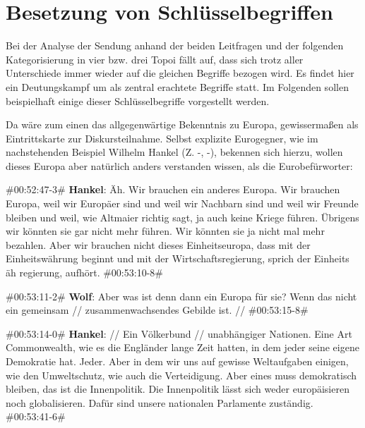 \section{Besetzung von Schlüsselbegriffen}\label{chap:schluesselbegriffe}

Bei der Analyse der Sendung anhand der beiden Leitfragen und der folgenden Kategorisierung in vier bzw. drei Topoi fällt auf, dass sich trotz aller Unterschiede immer wieder auf die gleichen Begriffe bezogen wird. Es findet hier ein Deutungskampf um als zentral erachtete Begriffe statt. Im Folgenden sollen beispielhaft einige dieser Schlüsselbegriffe vorgestellt werden.

Da wäre zum einen das allgegenwärtige Bekenntnis zu Europa, gewissermaßen als Eintrittskarte zur Diskursteilnahme. Selbst explizite Eurogegner, wie im nachstehenden Beispiel Wilhelm Hankel (Z. -, -), bekennen sich hierzu, wollen dieses Europa aber natürlich anders verstanden wissen, als die Eurobefürworter:

\begin{description}
	\begin{linenumbers}[1]
		\item \#00:52:47-3\# \textbf{Hankel}: Äh. Wir brauchen ein anderes Europa. Wir brauchen Europa, weil wir Europäer sind und weil wir Nachbarn sind und weil wir Freunde bleiben und weil, wie Altmaier richtig sagt, ja auch keine Kriege führen. Übrigens wir könnten sie gar nicht mehr führen. Wir könnten sie ja nicht mal mehr bezahlen. Aber wir brauchen nicht dieses Einheitseuropa, dass mit der Einheitswährung beginnt und mit der Wirtschaftsregierung, sprich der Einheits äh regierung, aufhört. \#00:53:10-8\#
		
		\item \#00:53:11-2\# \textbf{Wolf}: Aber was ist denn dann ein Europa für sie? Wenn das nicht ein gemeinsam // zusammenwachsendes Gebilde ist. // \#00:53:15-8\#
		
		\item \#00:53:14-0\# \textbf{Hankel}: // Ein Völkerbund // unabhängiger Nationen. Eine Art Commonwealth, wie es die Engländer lange Zeit hatten, in dem jeder seine eigene Demokratie hat. Jeder. Aber in dem wir uns auf gewisse Weltaufgaben einigen, wie den Umweltschutz, wie auch die Verteidigung. Aber eines muss demokratisch bleiben, das ist die Innenpolitik. Die Innenpolitik lässt sich weder europäisieren noch globalisieren. Dafür sind unsere nationalen Parlamente zuständig. \#00:53:41-6\# 
	\end{linenumbers}
\end{description}

